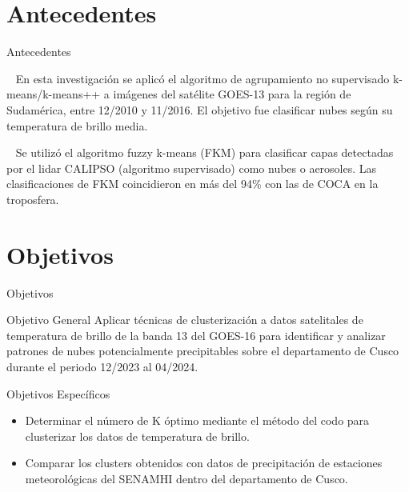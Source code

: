 \documentclass[aspectratio=169,xcolor=dvipsnames]{beamer}
\begin{document}
\section{Antecedentes}
\begin{frame}{Antecedentes}
    \begin{block}{~\cite{b3}}
        En esta investigación se aplicó el algoritmo de agrupamiento no supervisado k-means/k-means++ a imágenes del satélite GOES-13 para la región de Sudamérica, entre 12/2010 y 11/2016. El objetivo fue clasificar nubes según su temperatura de brillo media.
    \end{block}
    
    \begin{block}{~\cite{b4}}
        Se utilizó el algoritmo fuzzy k-means (FKM) para clasificar capas detectadas por el lidar CALIPSO (algoritmo supervisado) como nubes o aerosoles. Las clasificaciones de FKM coincidieron en más del 94\% con las de COCA en la troposfera.
    \end{block}
    
    
\end{frame}
\section{Objetivos}
\begin{frame}{Objetivos}
    
    \begin{block}{Objetivo General}
        Aplicar técnicas de clusterización a datos satelitales de temperatura de brillo de la banda 13 del GOES-16 para identificar y analizar patrones de nubes potencialmente precipitables sobre el departamento de Cusco durante el periodo 12/2023 al 04/2024.
    \end{block}

    \begin{block}{Objetivos Específicos}
        \begin{itemize}
            \item Determinar el número de K óptimo mediante el método del codo para clusterizar los datos de temperatura de brillo.
            \item Comparar los clusters obtenidos con datos de precipitación de estaciones meteorológicas del SENAMHI dentro del departamento de Cusco.
        \end{itemize}
    \end{block}
\end{frame}
\end{document}
